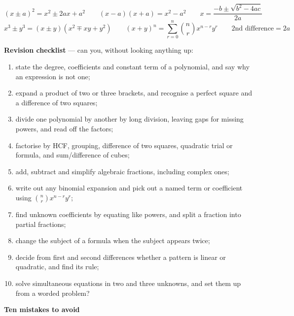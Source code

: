 \documentclass[11pt]{article}
\begin{document}
\begin{formulabox}
\[(x\pm a)^{2}=x^{2}\pm2ax+a^{2}\qquad (x-a)(x+a)=x^{2}-a^{2}\qquad x=\frac{-b\pm\sqrt{b^{2}-4ac}}{2a}\]
\[x^{3}\pm y^{3}=(x\pm y)(x^{2}\mp xy+y^{2})\qquad
(x+y)^{n}=\sum_{r=0}^{n}\binom nrx^{n-r}y^{r}\qquad \text{2nd difference}=2a\]
\end{formulabox}

\textbf{Revision checklist} --- can you, without looking anything up:
\begin{enumerate}[topsep=2pt,itemsep=0pt,leftmargin=*,label=$\square$]
\item state the degree, coefficients and constant term of a polynomial, and say why an expression is not one;
\item expand a product of two or three brackets, and recognise a perfect square and a difference of two squares;
\item divide one polynomial by another by long division, leaving gaps for missing powers, and read off the factors;
\item factorise by HCF, grouping, difference of two squares, quadratic trial or formula, and sum/difference of cubes;
\item add, subtract and simplify algebraic fractions, including complex ones;
\item write out any binomial expansion and pick out a named term or coefficient using $\binom nr x^{n-r}y^{r}$;
\item find unknown coefficients by equating like powers, and split a fraction into partial fractions;
\item change the subject of a formula when the subject appears twice;
\item decide from first and second differences whether a pattern is linear or quadratic, and find its rule;
\item solve simultaneous equations in two and three unknowns, and set them up from a worded problem?
\end{enumerate}

\textbf{Ten mistakes to avoid}
\end{document}
